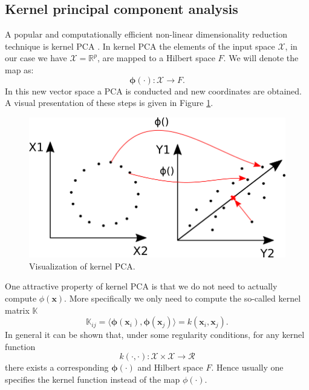 \subsection{Kernel principal component analysis}
A popular and computationally efficient non-linear dimensionality reduction technique is kernel PCA \parencite{scholkopf_kernel_1997}. In kernel PCA the elements of the input space $\mathcal{X}$, in our case we have $\mathcal{X} = \mathbb{R}^p$, are mapped to a Hilbert space $F$. We will denote the map as: 
\[\bm{\phi}(\cdot): \mathcal{X} \to F.\]
In this new vector space a PCA is conducted and new coordinates are obtained. A visual presentation of these steps is given in Figure \ref{fig:KernelPCA}. \\
\begin{figure}[!htb]
\centering
\includegraphics[scale=0.5]{VectorGraphics/KernelPCA.png}
\caption{\label{fig:KernelPCA}Visualization of kernel PCA.}
\end{figure}

One attractive property of kernel PCA is that we do not need to actually compute $\phi(\bm{x})$. More specifically we only need to compute the so-called kernel matrix $\mathbb{K}$
\[\mathbb{K}_{ij} = \langle \bm{\phi} (\bm{x}_i), \bm{\phi} (\bm{x}_j)  \rangle = k(\bm{x}_i,\bm{x}_j).\]
In general it can be shown that, under some regularity conditions, for any kernel function
\[k(\cdot,\cdot): \mathcal{X} \times \mathcal{X} \to \mathcal{R}\] 
there exists a corresponding $\bm{\phi}(\cdot)$ and Hilbert space $F$. Hence usually one specifies the kernel function instead of the map $\phi(\cdot)$.\\ 

